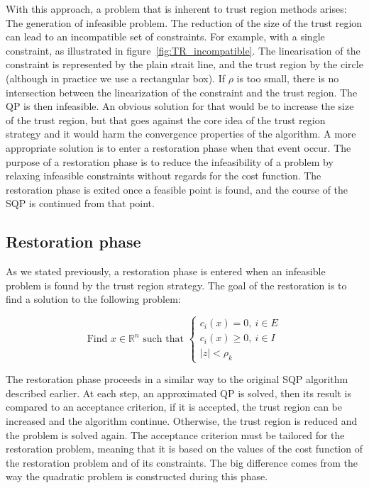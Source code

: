 With this approach, a problem that is inherent to trust region methods arises: The generation of infeasible problem.
The reduction of the size of the trust region can lead to an incompatible set of constraints.
For example, with a single constraint, as illustrated in figure~\ref{fig:TR_incompatible}.
The linearisation of the constraint is represented by the plain strait line, and the trust region by the circle (although in practice we use a rectangular box).
If $\rho$ is too small, there is no intersection between the linearization of the constraint and the trust region.
The QP is then infeasible.
An obvious solution for that would be to increase the size of the trust region, but that goes against the core idea of the trust region strategy and it would harm the convergence properties of the algorithm.
A more appropriate solution is to enter a restoration phase when that event occur.
The purpose of a restoration phase is to reduce the infeasibility of a problem by relaxing infeasible constraints without regards for the cost function.
The restoration phase is exited once a feasible point is found, and the course of the SQP is continued from that point.

\subsection{Restoration phase}
\label{sub:restoration_phase}

As we stated previously, a restoration phase is entered when an infeasible problem is found by the trust region strategy.
The goal of the restoration is to find a solution to the following problem:

\begin{equation}
    \text{Find $x\in\mathbb{R}^n$ such that }
    \left\{
    \begin{array}{l}
      c_i(x)=0,\ i\in E \\
      c_i(x)\geq 0,\ i\in I\\
      |z|<\rho_k
    \end{array}
    \right.
\label{eq:resto_NL}
\end{equation}

The restoration phase proceeds in a similar way to the original SQP algorithm described earlier.
At each step, an approximated QP is solved, then its result is compared to an acceptance criterion, if it is accepted, the trust region can be increased and the algorithm continue.
Otherwise, the trust region is reduced and the problem is solved again.
The acceptance criterion must be tailored for the restoration problem, meaning that it is based on the values of the cost function of the restoration problem and of its constraints.
The big difference comes from the way the quadratic problem is constructed during this phase.

